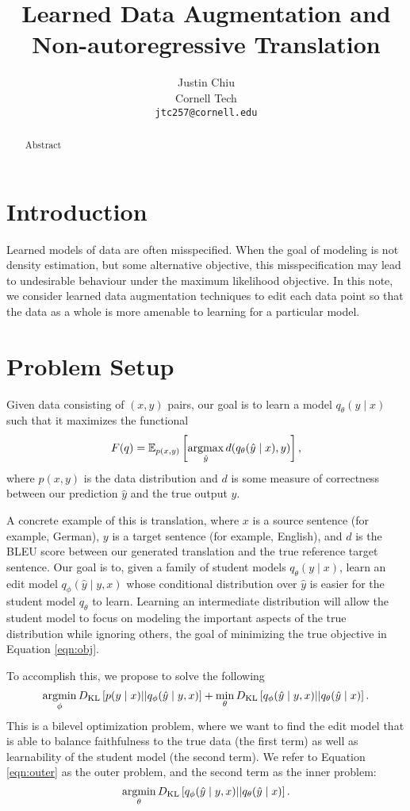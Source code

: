 \documentclass[11pt]{article}
\title{Learned Data Augmentation and Non-autoregressive Translation}
\author{Justin Chiu \\
  Cornell Tech \\
  \texttt{jtc257@cornell.edu}}
\begin{document}
\maketitle
\begin{abstract}
Abstract
\end{abstract}

\section{Introduction}
Learned models of data are often misspecified.
When the goal of modeling is not density estimation,
but some alternative objective, this misspecification may lead to undesirable
behaviour under the maximum likelihood objective.
In this note, we consider learned data augmentation techniques to edit
each data point so that the data as a whole is more amenable to learning for a particular model.

\section{Problem Setup}
Given data consisting of $(x,y)$ pairs, our goal is to learn a model $q_\theta(y \mid x)$
such that it maximizes the functional
\begin{equation}
    \label{eqn:obj}
    F(q) = \mathbb{E}_{p(x,y)}\left[\operatorname*{argmax}_{\hat{y}}d(q_\theta(\hat{y} \mid x), y)\right],
\end{equation}
where $p(x,y)$ is the data distribution and $d$ is some measure of correctness between our
prediction $\hat{y}$ and the true output $y$.

A concrete example of this is translation, where $x$ is a source sentence (for example, German),
$y$ is a target sentence (for example, English),
and $d$ is the BLEU score between our generated translation and the true
reference target sentence.
Our goal is to, given a family of student models $q_\theta(y \mid x)$,
learn an edit model $q_\phi(\hat{y} \mid y, x)$ whose conditional distribution over $\hat{y}$
is easier for the student model $q_\theta$ to learn.
Learning an intermediate distribution will allow the student model to focus on modeling
the important aspects of the true distribution while ignoring others,
the goal of minimizing the true objective in Equation \ref{eqn:obj}.

To accomplish this, we propose to solve the following
\begin{equation}
    \label{eqn:outer}
    \operatorname*{argmin}_\phi D_\mathrm{KL}\left[p(y \mid x) || q_\phi(\hat{y} \mid y, x)\right]
    + \min_\theta D_\mathrm{KL}\left[q_\phi(\hat{y} \mid y, x) || q_\theta(\hat{y} \mid x)\right].
\end{equation}
This is a bilevel optimization problem, where we want to find the edit model
that is able to balance faithfulness to the true data (the first term)
as well as learnability of the student model (the second term).
We refer to Equation \ref{eqn:outer} as the outer problem,
and the second term as the inner problem:
\begin{equation}
    \label{eqn:inner}
    \operatorname*{argmin}_\theta D_\mathrm{KL}\left[q_\phi(\hat{y} \mid y, x) || q_\theta(\hat{y} \mid x)\right].
\end{equation}
\end{document}
